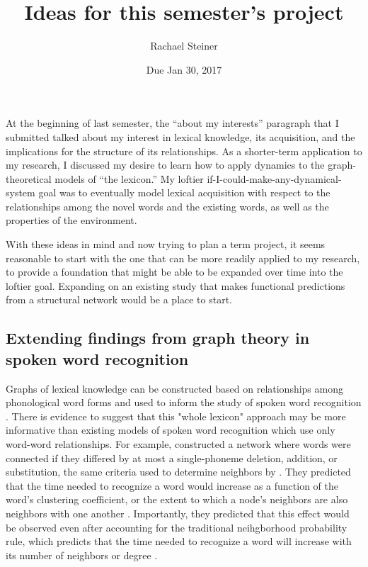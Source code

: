 \documentclass{article}
\title{Ideas for this semester's project}
\date{Due Jan 30, 2017}
\author{Rachael Steiner}
\begin{document}
\maketitle

At the beginning of last semester, the ``about my interests'' paragraph
that I submitted talked about my interest in lexical knowledge, its
acquisition, and the implications for the structure of its
relationships. As a shorter-term application to my research, I discussed
my desire to learn how to apply dynamics to the graph-theoretical models
of ``the lexicon.'' My loftier if-I-could-make-any-dynamical-system goal
was to eventually model lexical acquisition with respect to the
relationships among the novel words and the existing words, as well as
the properties of the environment.

With these ideas in mind and now trying to plan a term project, it seems reasonable
to start with the one that can be more readily applied to my research, to provide
a foundation that might be able to be expanded over time into the loftier goal.
Expanding on an existing study that makes functional predictions from a structural
network would be a place to start.

\subsection{Extending findings from graph theory in spoken word
recognition}\label{extending-findings-from-graph-theory-in-spoken-word-recognition}

Graphs of lexical knowledge can be constructed based on relationships among
phonological word forms and used to inform the study of spoken word recognition
\citep{vit08}. There is evidence to suggest that this "whole lexicon" approach
may be more informative than existing models of spoken word recognition which
use only word-word relationships. For example, \citet{ChVit09} constructed a
network where words were connected if they differed by at most a single-phoneme
deletion, addition, or substitution, the same criteria used to determine neighbors
by \citet{lp98}. They predicted that the time needed to recognize a word would
increase as a function of the word's clustering coefficient, or the extent to
which a node's neighbors are also neighbors with one another \citep{ws}.
Importantly, they predicted that this effect would be observed even after
accounting for the
traditional neihgborhood probability rule, which predicts that the time needed
to recognize a word will increase with its number of neighbors or degree \citep{lp98}.
\end{document}
